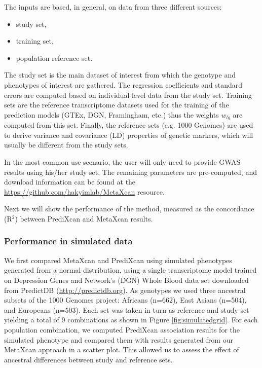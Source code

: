 \documentclass[10pt]{article}
\begin{document}
The inputs are based, in general, on data from three different sources: 
\begin{itemize}
\item study set,
\item training set,
\item population reference set. 
\end{itemize}

The study set is the main dataset of interest from which the genotype and phenotypes of interest are gathered. 
The regression coefficients and standard errors are computed based on individual-level data from the study set. Training sets are the reference transcriptome datasets used for the training of the prediction models (GTEx, DGN, Framingham, etc.) thus the weights $w_{lg}$ are computed from this set. Finally, the reference sets (e.g. 1000 Genomes) are used to derive variance and covariance (LD) properties of genetic markers, which will usually be different from the study sets.

In the most common use scenario, the user will only need to provide GWAS results using his/her study set. The remaining parameters are pre-computed, and download information can be found at the \url{https://github.com/hakyimlab/MetaXcan} resource.

Next we will show the performance of the method, measured as the concordance (R$^2$) between PrediXcan and MetaXcan results.


\subsubsection*{Performance in simulated data}

We first compared MetaXcan and PrediXcan using simulated phenotypes generated from a normal distribution, using a single transcriptome model trained on Depression Genes and Network's (DGN) Whole Blood data set \cite{Battle2014} downloaded from PredictDB (\url{http://predictdb.org}). As genotypes we used three ancestral subsets of the 1000 Genomes project: Africans (n=662), East Asians (n=504), and Europeans (n=503). Each set was taken in turn as reference and study set yielding a total of 9 combinations as shown in Figure \ref{fig:simulatedgrid}. For each population combination, we computed PrediXcan association results for the simulated phenotype and compared them with results generated from our MetaXcan approach in a scatter plot. This allowed us to assess the effect of ancestral differences between study and reference sets.
\end{document}
